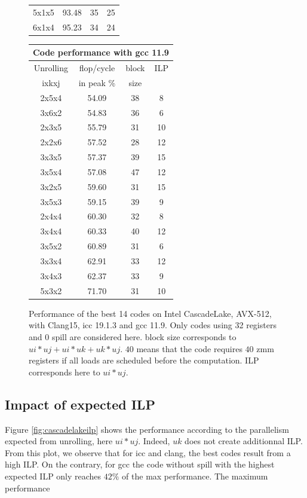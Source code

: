 \documentclass{article}
\begin{document}
\begin{figure}[h!]
{\begin{tabular}{|c|c|c|c|}
5x1x5 & 93.48 & 35 & 25 \\
6x1x4 & 95.23 & 34 & 24 \\
\hline
    \end{tabular}
    \begin{tabular}{|c|c|c|c|}
      \hline
      \multicolumn{4}{|c|}{Code performance with gcc 11.9} \\
      \hline
      Unrolling & flop/cycle & block  & ILP\\
      ixkxj& in peak \% & size & \\
      \hline
2x5x4 & 54.09 & 38 & 8 \\
3x6x2 & 54.83 & 36 & 6 \\
2x3x5 & 55.79 & 31 & 10 \\
2x2x6 & 57.52 & 28 & 12 \\
3x3x5 & 57.37 & 39 & 15 \\
3x5x4 & 57.08 & 47 & 12 \\
3x2x5 & 59.60 & 31 & 15 \\
3x5x3 & 59.15 & 39 & 9 \\
2x4x4 & 60.30 & 32 & 8 \\
3x4x4 & 60.33 & 40 & 12 \\
3x5x2 & 60.89 & 31 & 6 \\
3x3x4 & 62.91 & 33 & 12 \\
3x4x3 & 62.37 & 33 & 9 \\
5x3x2 & 71.70 & 31 & 10 \\
\hline
    \end{tabular}
}
\caption{Performance of the best 14 codes on Intel CascadeLake, AVX-512, with Clang15,  icc 19.1.3 and gcc 11.9. Only codes using 32 registers and 0 spill are considered here\label{fig:tables}. block size corresponds to $ui*uj+ui*uk+uk*uj$. $40$ means that the code requires $40$ zmm registers if all loads are scheduled before the computation. ILP corresponds here to $ui*uj$.}
\end{figure}

\subsection{Impact of expected ILP}
Figure \ref{fig:cascadelakeilp} shows the performance according to the parallelism expected from unrolling, here $ui * uj$. Indeed, $uk$ does not create additionnal ILP. From this plot, we observe that for icc and clang, the best codes result from a high ILP. On the contrary, for gcc the code without spill with the highest expected ILP only reaches $42\%$ of the max performance. The maximum performance  
\end{document}
